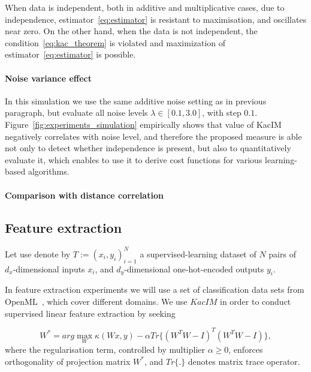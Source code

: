 \documentclass{article}
\begin{document}
When data is independent, both in additive and multiplicative cases, due to independence, estimator~\eqref{eq:estimator} is resistant to maximisation, and oscillates near zero. On the other hand, when the data is not independent, the condition~\eqref{eq:kac_theorem} is violated and maximization of estimator~\eqref{eq:estimator} is possible.
\paragraph{Noise variance effect} In this simulation we use the same additive noise setting as in previous paragraph, but evaluate all noise levels $\lambda \in [0.1, 3.0]$, with step $0.1$.
Figure~\ref{fig:experiments_simulation} empirically shows that value of KacIM  negatively correlates with noise level, and therefore the proposed measure is able not only to detect whether independence is present, but also to quantitatively evaluate it, which enables to use it to derive cost functions for various learning-based algorithms. 

\paragraph{Comparison with distance correlation}



\subsection{Feature extraction}
Let use denote by $T := (x_{i},y_{i})_{i=1}^{N}$ a supervised-learning dataset of $N$ pairs of $d_{x}$-dimensional inputs $x_{i}$, and $d_{y}$-dimensional one-hot-encoded outputs $y_{i}$.

In feature extraction experiments we will use a set of classification data sets from OpenML~\cite{OpenML2013}, which cover different domains.  We use $KacIM$ in order to conduct supervised linear feature extraction by seeking 

\begin{equation}
\label{eq:kim_feature_extraction}    
W^{*} = arg \max_{W} \kappa(Wx, y) - \alpha Tr\{(W^{T}W-I)^{T}(W^{T}W-I) \},
\end{equation}
where the regularisation term, controlled by multiplier $\alpha \geq 0$, enforces orthogonality of projection matrix $W^{*}$, and $Tr\{.\}$ denotes matrix trace operator.
\end{document}
